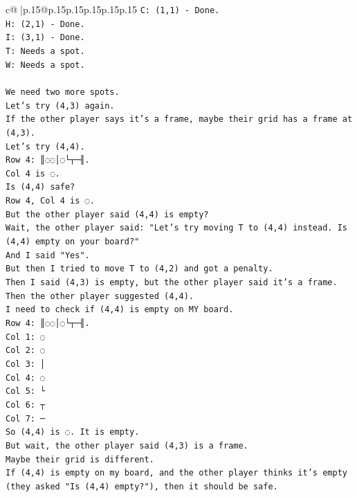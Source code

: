 \documentclass{article}
\begin{document}
{\begin{supertabular}{c@{$\;$}|p{.15\linewidth}@{}p{.15\linewidth}p{.15\linewidth}p{.15\linewidth}p{.15\linewidth}p{.15\linewidth}}
{{{\texttt{C: (1,1) {-} Done.} \\
\texttt{H: (2,1) {-} Done.} \\
\texttt{I: (3,1) {-} Done.} \\
\texttt{T: Needs a spot.} \\
\texttt{W: Needs a spot.} \\
\\ 
\texttt{We need two more spots.} \\
\texttt{Let's try (4,3) again.} \\
\texttt{If the other player says it's a frame, maybe their grid has a frame at (4,3).} \\
\texttt{Let's try (4,4).} \\
\texttt{Row 4: ║◌◌│◌└┬─╢.} \\
\texttt{Col 4 is ◌.} \\
\texttt{Is (4,4) safe?} \\
\texttt{Row 4, Col 4 is ◌.} \\
\texttt{But the other player said (4,4) is empty?} \\
\texttt{Wait, the other player said: "Let's try moving T to (4,4) instead. Is (4,4) empty on your board?"} \\
\texttt{And I said "Yes".} \\
\texttt{But then I tried to move T to (4,2) and got a penalty.} \\
\texttt{Then I said (4,3) is empty, but the other player said it's a frame.} \\
\texttt{Then the other player suggested (4,4).} \\
\texttt{I need to check if (4,4) is empty on MY board.} \\
\texttt{Row 4: ║◌◌│◌└┬─╢.} \\
\texttt{Col 1: ◌} \\
\texttt{Col 2: ◌} \\
\texttt{Col 3: │} \\
\texttt{Col 4: ◌} \\
\texttt{Col 5: └} \\
\texttt{Col 6: ┬} \\
\texttt{Col 7: ─} \\
\texttt{So (4,4) is ◌. It is empty.} \\
\texttt{But wait, the other player said (4,3) is a frame.} \\
\texttt{Maybe their grid is different.} \\
\texttt{If (4,4) is empty on my board, and the other player thinks it's empty (they asked "Is (4,4) empty?"), then it should be safe.} \\
}}}
\end{supertabular}}
\end{document}
